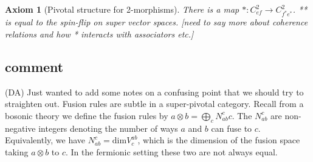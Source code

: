 \documentclass[12pt,a4paper]{article}
\newtheorem{axiom}[theorem]{Axiom}
\newcommand{\tp}{\otimes}
\newcommand{\nn}[1]{{\color{kwcolor}[#1]}}
\newcommand{\dave}[1]{{\color{ao(english)}\footnotesize{(DA) #1}}}
\begin{document}
\begin{axiom}[Pivotal structure for 2-morphisms]
There is a map $*:C^2_{ef} \to C^2_{f^*e^*}$.
** is equal to the spin-flip on super vector spaces.
\nn{need to say more about coherence relations and how * interacts with associators etc.}
\end{axiom}

 
 



 
\subsection{comment}
\dave{Just wanted to add some notes on a confusing point that we should try to straighten out.}
Fusion rules are subtle in a super-pivotal category. 
Recall from a bosonic theory we define the fusion rules by $a \tp b =\bigoplus_c N_{ab}^c c$. 
The $N_{ab}^c$ are non-negative integers denoting the number of ways $a$ and $b$ can fuse to $c$. 
Equivalently, we have $N_{ab}^c = \text{dim} V^{ab}_c$, 
which is the dimension of the fusion space taking $a \tp b$ to $c$. 
In the fermionic setting these two are not always equal. 
\end{document}
